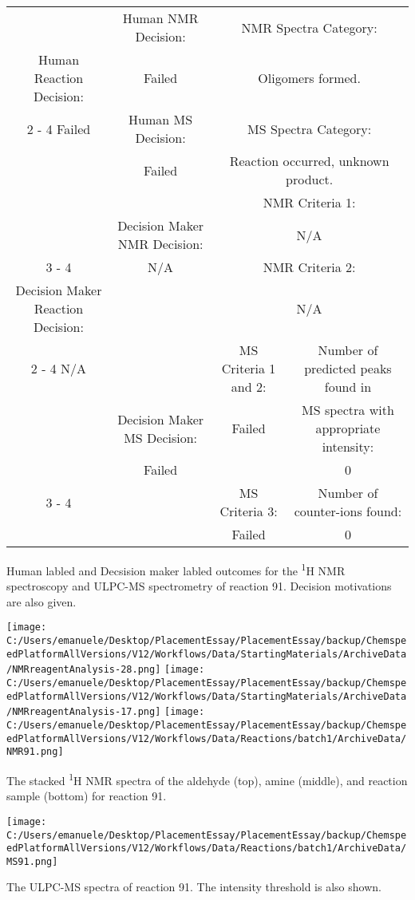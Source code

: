 \documentclass{article}%
\begin{document}
\begin{Decision Table}[H]%
\begin{tabular}{|c|c|c|c|}%
\hline%
&Human NMR Decision:&\multicolumn{2}{|c|}{NMR Spectra Category:}\\%
Human Reaction Decision:&Failed&\multicolumn{2}{|c|}{Oligomers formed.}\\%
\cline{2%
-%
4}%
Failed&Human MS Decision:&\multicolumn{2}{|c|}{MS Spectra Category:}\\%
&Failed&\multicolumn{2}{|c|}{Reaction occurred, unknown product.}\\%
\hline%
&&\multicolumn{2}{|c|}{NMR Criteria 1:}\\%
&Decision Maker NMR Decision:&\multicolumn{2}{|c|}{N/A}\\%
\cline{3%
-%
4}%
&N/A&\multicolumn{2}{|c|}{NMR Criteria 2:}\\%
Decision Maker Reaction Decision:&&\multicolumn{2}{|c|}{N/A}\\%
\cline{2%
-%
4}%
N/A&&MS Criteria 1 and 2:&Number of predicted peaks found in\\%
&Decision Maker MS Decision:&Failed&MS spectra with appropriate intensity:\\%
&Failed&&0\\%
\cline{3%
-%
4}%
&&MS Criteria 3:&Number of counter{-}ions found:\\%
&&Failed&0\\%
\hline%
\end{tabular}%
\caption{Human labled and Decsision maker labled outcomes for the \textsuperscript{1}H NMR spectroscopy and ULPC-MS spectrometry of reaction 91. Decision motivations are also given.}%
\end{Decision Table}%
\begin{NMR Spectra}[H]%
\begin{center}%
\texttt{[image: C:/Users/emanuele/Desktop/PlacementEssay/PlacementEssay/backup/ChemspeedPlatformAllVersions/V12/Workflows/Data/StartingMaterials/ArchiveData/NMRreagentAnalysis-28.png]}\hfill%
\texttt{[image: C:/Users/emanuele/Desktop/PlacementEssay/PlacementEssay/backup/ChemspeedPlatformAllVersions/V12/Workflows/Data/StartingMaterials/ArchiveData/NMRreagentAnalysis-17.png]}\hfill%
\texttt{[image: C:/Users/emanuele/Desktop/PlacementEssay/PlacementEssay/backup/ChemspeedPlatformAllVersions/V12/Workflows/Data/Reactions/batch1/ArchiveData/NMR91.png]}\hfill%
\end{center}%
\caption{The stacked \textsuperscript{1}H NMR spectra of the aldehyde (top), amine (middle), and reaction sample (bottom) for reaction 91.}%
\end{NMR Spectra}%
\begin{MS Spectra}[H]%
\begin{center}%
\texttt{[image: C:/Users/emanuele/Desktop/PlacementEssay/PlacementEssay/backup/ChemspeedPlatformAllVersions/V12/Workflows/Data/Reactions/batch1/ArchiveData/MS91.png]}\hfill%
\end{center}%
\caption{The ULPC-MS spectra of reaction 91. The intensity threshold is also shown.}%
\end{MS Spectra}%
\end{document}
